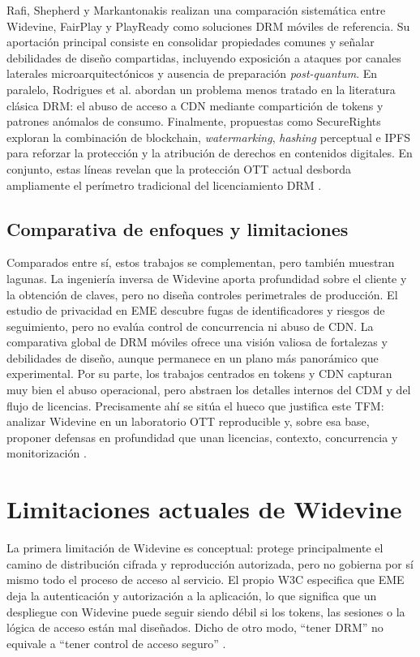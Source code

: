 Rafi, Shepherd y Markantonakis realizan una comparación sistemática entre Widevine, FairPlay y PlayReady como soluciones DRM móviles de referencia. Su aportación principal consiste en consolidar propiedades comunes y señalar debilidades de diseño compartidas, incluyendo exposición a ataques por canales laterales microarquitectónicos y ausencia de preparación \textit{post-quantum}. En paralelo, Rodrigues et al. abordan un problema menos tratado en la literatura clásica DRM: el abuso de acceso a CDN mediante compartición de tokens y patrones anómalos de consumo. Finalmente, propuestas como SecureRights exploran la combinación de blockchain, \textit{watermarking}, \textit{hashing} perceptual e IPFS para reforzar la protección y la atribución de derechos en contenidos digitales. En conjunto, estas líneas revelan que la protección OTT actual desborda ampliamente el perímetro tradicional del licenciamiento DRM \cite{rafi2023mobiledrm,rodrigues2024cdn,securerights2024}.

\subsection{Comparativa de enfoques y limitaciones}

Comparados entre sí, estos trabajos se complementan, pero también muestran lagunas. La ingeniería inversa de Widevine aporta profundidad sobre el cliente y la obtención de claves, pero no diseña controles perimetrales de producción. El estudio de privacidad en EME descubre fugas de identificadores y riesgos de seguimiento, pero no evalúa control de concurrencia ni abuso de CDN. La comparativa global de DRM móviles ofrece una visión valiosa de fortalezas y debilidades de diseño, aunque permanece en un plano más panorámico que experimental. Por su parte, los trabajos centrados en tokens y CDN capturan muy bien el abuso operacional, pero abstraen los detalles internos del CDM y del flujo de licencias. Precisamente ahí se sitúa el hueco que justifica este TFM: analizar Widevine en un laboratorio OTT reproducible y, sobre esa base, proponer defensas en profundidad que unan licencias, contexto, concurrencia y monitorización \cite{patat2022,patat2023,rafi2023mobiledrm,rodrigues2024cdn,securerights2024}.

\section{Limitaciones actuales de Widevine}

La primera limitación de Widevine es conceptual: protege principalmente el camino de distribución cifrada y reproducción autorizada, pero no gobierna por sí mismo todo el proceso de acceso al servicio. El propio W3C especifica que EME deja la autenticación y autorización a la aplicación, lo que significa que un despliegue con Widevine puede seguir siendo débil si los tokens, las sesiones o la lógica de acceso están mal diseñados. Dicho de otro modo, \enquote{tener DRM} no equivale a \enquote{tener control de acceso seguro} \cite{w3ceme2026,widevine2024}.

